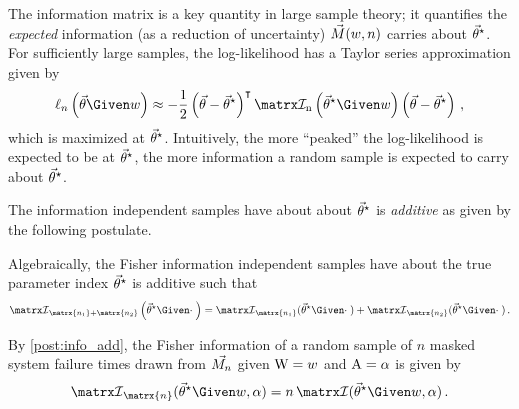 \documentclass[../main.tex]{subfiles}
\begin{document}
The information matrix is a key quantity in large sample theory; it quantifies the \emph{expected} information (as a reduction of uncertainty) $\vec{M}(w,n)$ carries about ${\vec{\theta}}^{\star}$.
For sufficiently large samples, the log-likelihood has a Taylor series approximation given by
\begin{equation}
    \ell_n\left(\sysparamvec \Given w\right) \approx -\frac{1}{2}\left(\sysparamvec - \tparam\sysparamvec\right)^\intercal \infomatrxn\left(\tparam\sysparamvec \Given w\right)\left(\sysparamvec - \tparam\sysparamvec\right)\,,
\end{equation}
which is maximized at ${\vec{\theta}}^{\star}$.
Intuitively, the more ``peaked'' the log-likelihood is expected to be at ${\vec{\theta}}^{\star}$, the more information a random sample is expected to carry about ${\vec{\theta}}^{\star}$.

The information independent samples have about about ${\vec{\theta}}^{\star}$ is \emph{additive} as given by the following postulate.
\begin{postulate}
\label{post:info_add}
Algebraically, the Fisher information independent samples have about the true parameter index ${\vec{\theta}}^{\star}$  is additive such that
\begin{equation}
    \infomatrx_{\matrx{n_1} + \matrx{n_2}}\left(\tparam\sysparamvec \Given 
    \cdot \; \right) = \infomatrx_{\matrx{n_1}}(\tparam\sysparamvec \Given 
    \cdot \;) + \infomatrx_{\matrx{n_2}}(\tparam\sysparamvec \Given \cdot \;)\,.
\end{equation}
\end{postulate}
By \cref{post:info_add}, the Fisher information of a random sample of $n$ masked system failure times drawn from $\vec{M_n}$ given $\mathrm{W} = w$ and $\mathrm{A} = \alpha$ is given by
\begin{equation}
    \infomatrx_{\matrx{n}}(\tparam\sysparamvec \Given w, \alpha) = n \infomatrx(\tparam\sysparamvec \Given w, \alpha)\,.
\end{equation}
\end{document}
